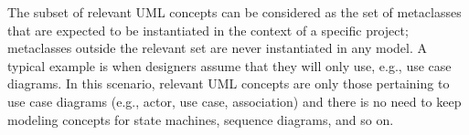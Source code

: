 The subset of relevant UML concepts can be considered as the set of metaclasses that are expected to be instantiated
in the context of a specific project; metaclasses outside the relevant set are never instantiated in any model.
A typical example is when designers assume that they will only use, e.g., use case diagrams.
In this scenario, relevant UML concepts are only those pertaining to use case diagrams (e.g., actor, use case, association)
and there is no need to keep modeling concepts for state machines, sequence diagrams, and so on.
%
